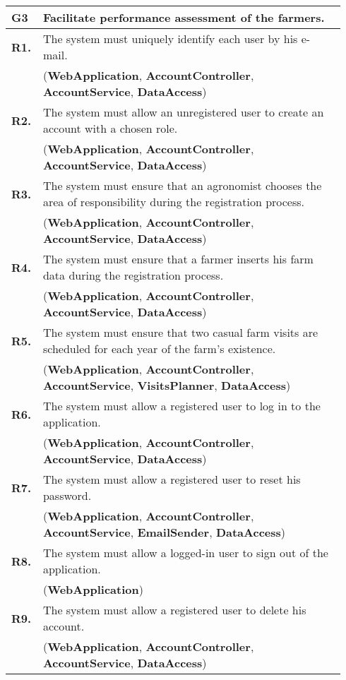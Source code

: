 \begin{longtable}{p{0.06\linewidth} p{0.88\linewidth}} 
    \toprule
    \textbf{G3} & Facilitate performance assessment of the farmers. \\
    \midrule
    
	\textbf{R1.} & The system must uniquely identify each user by his e-mail. \\
	& (\textbf{WebApplication}, \textbf{AccountController}, \textbf{AccountService}, \textbf{DataAccess})\\
	\textbf{R2.} & The system must allow an unregistered user to create an account with a chosen role. \\
	& (\textbf{WebApplication}, \textbf{AccountController}, \textbf{AccountService}, \textbf{DataAccess})\\
	\textbf{R3.} & The system must ensure that an agronomist chooses the area of responsibility during the registration process. \\
	& (\textbf{WebApplication}, \textbf{AccountController}, \textbf{AccountService}, \textbf{DataAccess})\\
	\textbf{R4.} & The system must ensure that a farmer inserts his farm data during the registration process.\\
	& (\textbf{WebApplication}, \textbf{AccountController}, \textbf{AccountService}, \textbf{DataAccess})\\
	\textbf{R5.} & The system must ensure that two casual farm visits are scheduled for each year of the farm's existence.\\
	& (\textbf{WebApplication}, \textbf{AccountController}, \textbf{AccountService}, \textbf{VisitsPlanner}, \textbf{DataAccess})\\
	\textbf{R6.} & The system must allow a registered user to log in to the application. \\
	& (\textbf{WebApplication}, \textbf{AccountController}, \textbf{AccountService}, \textbf{DataAccess})\\
	\textbf{R7.} & The system must allow a registered user to reset his password. \\
	& (\textbf{WebApplication}, \textbf{AccountController}, \textbf{AccountService}, \textbf{EmailSender}, \textbf{DataAccess})\\
	\textbf{R8.} & The system must allow a logged-in user to sign out of the application.\\
	& (\textbf{WebApplication})\\
	\textbf{R9.} & The system must allow a registered user to delete his account. \\
	& (\textbf{WebApplication}, \textbf{AccountController}, \textbf{AccountService}, \textbf{DataAccess})\\
	

\end{longtable}
